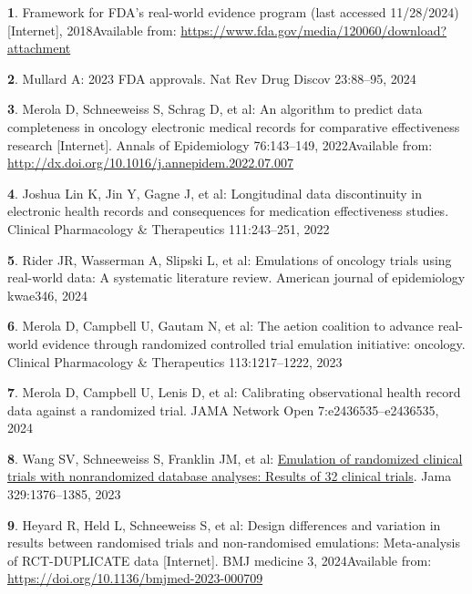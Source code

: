 \documentclass[
  letterpaper,
  DIV=11,
  numbers=noendperiod]{scrartcl}
\newlength{\cslhangindent}
\newenvironment{CSLReferences}[2] %
 {\begin{list}{}{%
  \setlength{\itemindent}{0pt}
  \setlength{\leftmargin}{0pt}
  \setlength{\parsep}{0pt}
  \ifodd #1
   \setlength{\leftmargin}{\cslhangindent}
   \setlength{\itemindent}{-1\cslhangindent}
  \fi
  \setlength{\itemsep}{#2\baselineskip}}}
 {\end{list}}
\begin{document}
\label{refs}
\begin{CSLReferences}{0}{1}
\textbf{1}. Framework for FDA's real-world evidence program (last
accessed 11/28/2024) {[}Internet{]}, 2018Available from:
\url{https://www.fda.gov/media/120060/download?attachment}

\textbf{2}. Mullard A: 2023 FDA approvals. Nat Rev Drug Discov
23:88--95, 2024

\textbf{3}. Merola D, Schneeweiss S, Schrag D, et al: An algorithm to
predict data completeness in oncology electronic medical records for
comparative effectiveness research {[}Internet{]}. Annals of
Epidemiology 76:143--149, 2022Available from:
\url{http://dx.doi.org/10.1016/j.annepidem.2022.07.007}

\textbf{4}. Joshua Lin K, Jin Y, Gagne J, et al: Longitudinal data
discontinuity in electronic health records and consequences for
medication effectiveness studies. Clinical Pharmacology \& Therapeutics
111:243--251, 2022

\textbf{5}. Rider JR, Wasserman A, Slipski L, et al: Emulations of
oncology trials using real-world data: A systematic literature review.
American journal of epidemiology kwae346, 2024

\textbf{6}. Merola D, Campbell U, Gautam N, et al: The aetion coalition
to advance real-world evidence through randomized controlled trial
emulation initiative: oncology. Clinical Pharmacology \& Therapeutics
113:1217--1222, 2023

\textbf{7}. Merola D, Campbell U, Lenis D, et al: Calibrating
observational health record data against a randomized trial. JAMA
Network Open 7:e2436535--e2436535, 2024

\textbf{8}. Wang SV, Schneeweiss S, Franklin JM, et al:
\href{https://doi.org/10.1001/jama.2023.4221}{Emulation of randomized
clinical trials with nonrandomized database analyses: Results of 32
clinical trials}. Jama 329:1376--1385, 2023

\textbf{9}. Heyard R, Held L, Schneeweiss S, et al: Design differences
and variation in results between randomised trials and non-randomised
emulations: Meta-analysis of RCT-DUPLICATE data {[}Internet{]}. BMJ
medicine 3, 2024Available from:
\url{https://doi.org/10.1136/bmjmed-2023-000709}


\end{CSLReferences}
\end{document}
